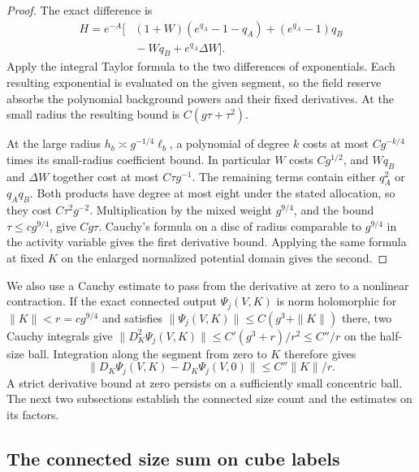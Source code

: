 \documentclass[11pt]{article}
\theoremstyle{definition}
\begin{document}
\begin{proof}
The exact difference is
\begin{equation}
\begin{aligned}
 H=e^{-A}\bigl[ &(1+W)(e^{q_A}-1-q_A)
              +(e^{q_A}-1)q_B\\
              &{}-Wq_B+e^{q_A}\Delta W\bigr].
\end{aligned}
\end{equation}
Apply the integral Taylor formula to the two differences of
exponentials. Each resulting exponential is evaluated on the given
segment, so the field reserve absorbs the polynomial background powers
and their fixed derivatives. At the small radius the resulting bound
is \(C(g\tau+\tau^2)\).

At the large radius \(h_b\asymp g^{-1/4}\ell_b\), a polynomial of
degree \(k\) costs at most \(Cg^{-k/4}\) times its small-radius
coefficient bound. In particular \(W\) costs \(Cg^{1/2}\), and
\(Wq_B\) and \(\Delta W\) together cost at most \(C\tau g^{-1}\).
The remaining terms contain either \(q_A^2\) or \(q_Aq_B\). Both
products have degree at most eight under the stated allocation, so
they cost \(C\tau^2g^{-2}\). Multiplication by the mixed weight
\(g^{9/4}\), and the bound \(\tau\le c g^{9/4}\), give \(Cg\tau\).
Cauchy's formula on a disc of radius comparable to \(g^{9/4}\) in
the activity variable gives the first derivative bound. Applying the
same formula at fixed \(K\) on the enlarged normalized potential
domain gives the second.
\end{proof}

We also use a Cauchy estimate to pass from the derivative at zero to
a nonlinear contraction. If the exact connected output \(\Psi_j(V,K)\)
is norm holomorphic for \(\|K\|<r=cg^{9/4}\) and satisfies
\(\|\Psi_j(V,K)\|\le C(g^3+\|K\|)\) there, two Cauchy integrals
give \(\|D_K^2\Psi_j(V,K)\|\le C'(g^3+r)/r^2\le C''/r\) on the
half-size ball. Integration along the segment from zero to \(K\)
therefore gives
\begin{equation}
 \|D_K\Psi_j(V,K)-D_K\Psi_j(V,0)\|\le C''\|K\|/r .
\end{equation}
A strict derivative bound at zero persists on a sufficiently small
concentric ball. The next two subsections establish the connected
size count and the estimates on its factors.

\subsection{The connected size sum on cube labels}
\label{sec:cube-linked-size}
\end{document}
